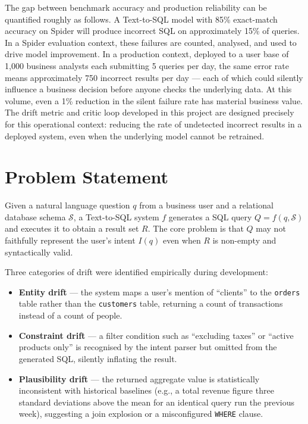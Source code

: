 \documentclass[12pt,a4paper]{report}
\begin{document}
The gap between benchmark accuracy and production reliability can be quantified roughly as follows. A Text-to-SQL model with 85\% exact-match accuracy on Spider will produce incorrect SQL on approximately 15\% of queries. In a Spider evaluation context, these failures are counted, analysed, and used to drive model improvement. In a production context, deployed to a user base of 1,000 business analysts each submitting 5 queries per day, the same error rate means approximately 750 incorrect results per day — each of which could silently influence a business decision before anyone checks the underlying data. At this volume, even a 1\% reduction in the silent failure rate has material business value. The drift metric and critic loop developed in this project are designed precisely for this operational context: reducing the rate of undetected incorrect results in a deployed system, even when the underlying model cannot be retrained.

\section{Problem Statement}
\label{sec:problem}

Given a natural language question $q$ from a business user and a relational database schema $\mathcal{S}$, a Text-to-SQL system $f$ generates a \ac{SQL} query $Q = f(q, \mathcal{S})$ and executes it to obtain a result set $R$. The core problem is that $Q$ may not faithfully represent the user's intent $I(q)$ even when $R$ is non-empty and syntactically valid.

Three categories of drift were identified empirically during development:

\begin{itemize}[leftmargin=2em]
  \item \textbf{Entity drift} — the system maps a user's mention of ``clients'' to the \texttt{orders} table rather than the \texttt{customers} table, returning a count of transactions instead of a count of people.
  \item \textbf{Constraint drift} — a filter condition such as ``excluding taxes'' or ``active products only'' is recognised by the intent parser but omitted from the generated \ac{SQL}, silently inflating the result.
  \item \textbf{Plausibility drift} — the returned aggregate value is statistically inconsistent with historical baselines (e.g., a total revenue figure three standard deviations above the mean for an identical query run the previous week), suggesting a join explosion or a misconfigured \texttt{WHERE} clause.
\end{itemize}
\end{document}
